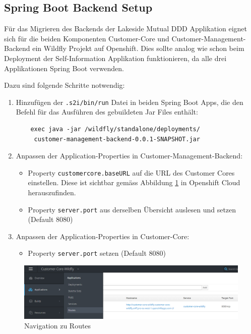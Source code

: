 \documentclass[12pt,a4paper]{article}
\begin{document}
\subsection{Spring Boot Backend Setup}
Für das Migrieren des Backends der Lakeside Mutual DDD Applikation eignet sich für die beiden Komponenten Customer-Core und Customer-Management-Backend ein Wildfly Projekt auf Openshift. Dies sollte analog wie schon beim Deployment der Self-Information Applikation funktionieren, da alle drei Applikationen Spring Boot verwenden. 

Dazu sind folgende Schritte notwendig:
\begin{enumerate}
	\item Hinzufügen der \texttt{.s2i/bin/run} Datei in beiden Spring Boot Apps, die den Befehl für das Ausführen des gebuildeten Jar Files enthält:
	\begin{lstlisting}
	exec java -jar /wildfly/standalone/deployments/
	 customer-management-backend-0.0.1-SNAPSHOT.jar
	\end{lstlisting}
	\item Anpassen der Application-Properties in Customer-Management-Backend: 
	\begin{itemize}
		\item Property \texttt{customercore.baseURL} auf die URL des Customer Cores einstellen. Diese ist sichtbar gemäss Abbildung \ref{fig:os-routes} in Openshift Cloud herauszufinden. 
		\item Property \texttt{server.port} aus derselben Übersicht auslesen und setzen (Default 8080)
	\end{itemize}
	\item Anpassen der Application-Properties in Customer-Core:
	\begin{itemize}
		\item Property \texttt{server.port} setzen (Default 8080)
	\end{itemize}
\end{enumerate}

\begin{figure}[h]
	\centering
	\includegraphics[width=1\linewidth]{img/os-routes}
	\caption{Navigation zu Routes}
	\label{fig:os-routes}
\end{figure}
\end{document}
